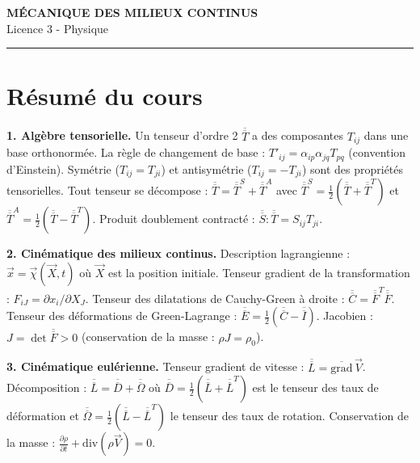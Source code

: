 \documentclass[12pt,a4paper]{article}
\begin{document}
\fi

\begin{center}
  {\LARGE\bfseries MÉCANIQUE DES MILIEUX CONTINUS}\\[0.3cm]
  {\normalsize Licence 3 - Physique}\\[0.1cm]
  \rule{0.7\textwidth}{0.8pt}
\end{center}

\section*{Résumé du cours}

\begin{boiteresume}

\textbf{1. Algèbre tensorielle.} Un tenseur d'ordre 2 $\overline{\overline{T}}$ a des composantes $T_{ij}$ dans une base orthonormée. La règle de changement de base : $T'_{ij} = \alpha_{ip}\alpha_{jq}T_{pq}$ (convention d'Einstein). Symétrie ($T_{ij}=T_{ji}$) et antisymétrie ($T_{ij}=-T_{ji}$) sont des propriétés tensorielles. Tout tenseur se décompose : $\overline{\overline{T}} = \overline{\overline{T}}^S + \overline{\overline{T}}^A$ avec $\overline{\overline{T}}^S = \frac{1}{2}(\overline{\overline{T}}+\overline{\overline{T}}^T)$ et $\overline{\overline{T}}^A = \frac{1}{2}(\overline{\overline{T}}-\overline{\overline{T}}^T)$. Produit doublement contracté : $\overline{\overline{S}}:\overline{\overline{T}} = S_{ij}T_{ji}$.

\textbf{2. Cinématique des milieux continus.} Description lagrangienne : $\vec{x} = \vec{\chi}(\vec{X}, t)$ où $\vec{X}$ est la position initiale. Tenseur gradient de la transformation : $F_{iJ} = \partial x_i/\partial X_J$. Tenseur des dilatations de Cauchy-Green à droite : $\overline{\overline{C}} = \overline{\overline{F}}^T\overline{\overline{F}}$. Tenseur des déformations de Green-Lagrange : $\overline{\overline{E}} = \frac{1}{2}(\overline{\overline{C}}-\overline{\overline{I}})$. Jacobien : $J = \det\overline{\overline{F}} > 0$ (conservation de la masse : $\rho J = \rho_0$).

\textbf{3. Cinématique eulérienne.} Tenseur gradient de vitesse : $\overline{\overline{L}} = \overline{\mathrm{grad}}\,\vec{V}$. Décomposition : $\overline{\overline{L}} = \overline{\overline{D}} + \overline{\overline{\Omega}}$ où $\overline{\overline{D}} = \frac{1}{2}(\overline{\overline{L}}+\overline{\overline{L}}^T)$ est le tenseur des taux de déformation et $\overline{\overline{\Omega}} = \frac{1}{2}(\overline{\overline{L}}-\overline{\overline{L}}^T)$ le tenseur des taux de rotation. Conservation de la masse : $\frac{\partial \rho}{\partial t} + \mathrm{div}(\rho\vec{V}) = 0$.


\end{boiteresume}
\end{document}
